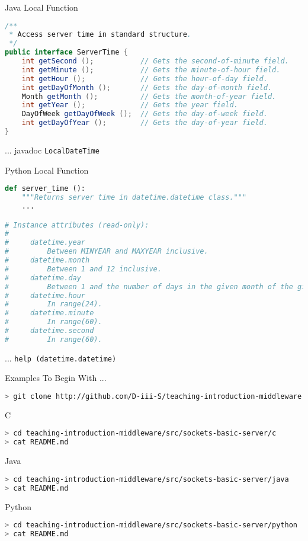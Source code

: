 \begin{frame}[fragile]{Java Local Function}
\begin{lstlisting}[language=java,style=mini]
/**
 * Access server time in standard structure.
 */
public interface ServerTime {
    int getSecond ();           // Gets the second-of-minute field.
    int getMinute ();           // Gets the minute-of-hour field.
    int getHour ();             // Gets the hour-of-day field.
    int getDayOfMonth ();       // Gets the day-of-month field.
    Month getMonth ();          // Gets the month-of-year field.
    int getYear ();             // Gets the year field.
    DayOfWeek getDayOfWeek ();  // Gets the day-of-week field.
    int getDayOfYear ();        // Gets the day-of-year field.
}
\end{lstlisting}
    \hfill ... javadoc \lstinline{LocalDateTime}
\end{frame}


\begin{frame}[fragile]{Python Local Function}
\begin{lstlisting}[language=python,style=mini]
def server_time ():
    """Returns server time in datetime.datetime class."""
    ...

# Instance attributes (read-only):
#
#     datetime.year
#         Between MINYEAR and MAXYEAR inclusive.
#     datetime.month
#         Between 1 and 12 inclusive.
#     datetime.day
#         Between 1 and the number of days in the given month of the given year.
#     datetime.hour
#         In range(24).
#     datetime.minute
#         In range(60).
#     datetime.second
#         In range(60).
\end{lstlisting}
    \hfill ... \lstinline{help (datetime.datetime)}
\end{frame}


\begin{frame}[fragile]{Examples To Begin With ...}
\begin{lstlisting}[language=bash,style=mini]
> git clone http://github.com/D-iii-S/teaching-introduction-middleware.git
\end{lstlisting}
    \begin{block}{C}
\begin{lstlisting}[language=bash,style=mini]
> cd teaching-introduction-middleware/src/sockets-basic-server/c
> cat README.md
\end{lstlisting}
    \end{block}
    \begin{block}{Java}
\begin{lstlisting}[language=bash,style=mini]
> cd teaching-introduction-middleware/src/sockets-basic-server/java
> cat README.md
\end{lstlisting}
    \end{block}
    \begin{block}{Python}
\begin{lstlisting}[language=bash,style=mini]
> cd teaching-introduction-middleware/src/sockets-basic-server/python
> cat README.md
\end{lstlisting}
    \end{block}
\end{frame}


